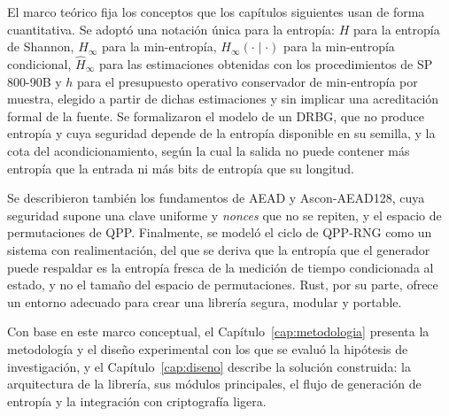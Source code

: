 El marco teórico fija los conceptos que los capítulos siguientes usan de forma cuantitativa. Se adoptó una notación única para la entropía: $H$ para la entropía de Shannon, $H_\infty$ para la min-entropía, $H_\infty(\cdot \mid \cdot)$ para la min-entropía condicional, $\hat{H}_\infty$ para las estimaciones obtenidas con los procedimientos de SP 800-90B y $h$ para el presupuesto operativo conservador de min-entropía por muestra, elegido a partir de dichas estimaciones y sin implicar una acreditación formal de la fuente. Se formalizaron el modelo de un DRBG, que no produce entropía y cuya seguridad depende de la entropía disponible en su semilla, y la cota del acondicionamiento, según la cual la salida no puede contener más entropía que la entrada ni más bits de entropía que su longitud.

Se describieron también los fundamentos de AEAD y Ascon-AEAD128, cuya seguridad supone una clave uniforme y \textit{nonces} que no se repiten, y el espacio de permutaciones de QPP. Finalmente, se modeló el ciclo de QPP-RNG como un sistema con realimentación, del que se deriva que la entropía que el generador puede respaldar es la entropía fresca de la medición de tiempo condicionada al estado, y no el tamaño del espacio de permutaciones. Rust, por su parte, ofrece un entorno adecuado para crear una librería segura, modular y portable.

Con base en este marco conceptual, el Capítulo~\ref{cap:metodologia} presenta la metodología y el diseño experimental con los que se evaluó la hipótesis de investigación, y el Capítulo~\ref{cap:diseno} describe la solución construida: la arquitectura de la librería, sus módulos principales, el flujo de generación de entropía y la integración con criptografía ligera.